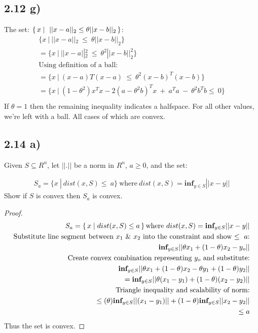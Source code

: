 \documentclass[12pt]{article}
\begin{document}
\subsection*{2.12 g)}
The set: $\set{x |\ ||x-a||_2 \le \theta||x-b||_2}$:
\begin{align*}
\{x\ |\ ||x-a||_2\ \le\ \theta||x-b||_2\}\\
= \{x\ |\ ||x-a||_2^2\ \le\ \theta^2||x-b||_2^2\}\\
\text{Using definition of a ball:}\\
= \{x\ |\ (x-a)T(x-a)\ \le\ \theta^2(x-b)^T(x-b)\}\\
= \{x\ |\ (1-\theta^2)x^Tx - 2(a-\theta^2b)^Tx\ +\ a^Ta\ -\ \theta^2b^Tb \le\ 0\}\\
\end{align*}
If $\theta = 1$ then the remaining inequality indicates a halfspace.
For all other values, we're left with a ball. All cases of which are convex.

\subsection*{2.14 a)}
Given $S \subseteq R^n$, let $||.||$ be a norm in $R^n$, $a \ge 0$, and the set:

\begin{align*}
S_a = \{x\ |\ dist(x,S) \le\ a\}\ \text{where}\ dist(x,S) = \textbf{inf}_{y\in S}||x-y|| 
\end{align*}
Show if $S$ is convex then $S_a$ is convex.\\


\begin{proof}
\begin{align*}
S_a = \set{x | dist(x,S) \le a} \text{where}\ dist(x,S) = \textbf{inf}_{y\in S}||x-y||\\
\text{Substitute line segment between $x_1$ \& $x_2$ into the constraint and show $\le\ a$:}\\
\textbf{inf}_{y\in S}|| \theta x_1 + (1-\theta)x_2-y_o||\\
\text{Create convex combination representing $y_o$ and substitute:}\\
\textbf{inf}_{y\in S}|| \theta x_1 + (1-\theta)x_2-\theta y_1 + (1-\theta)y_2||\\
= \textbf{inf}_{y\in S}|| \theta (x_1 - y_1) + (1-\theta)(x_2 - y_2)||\\
\text{Triangle inequality and scalability of norm:}\\
\le (\theta) \textbf{inf}_{y\in S}||(x_1 - y_1)|| + (1-\theta)\textbf{inf}_{y \in S}||x_2 - y_2||\\
\le a
\end{align*}
Thus the set is convex.
\end{proof}
\end{document}
